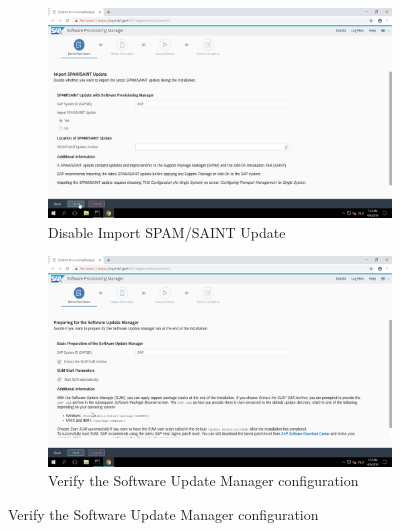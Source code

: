 \begin{figure}[!htb]\ContinuedFloat
    \begin{subfigure}{0.5\textwidth}
        \captionsetup{width=0.8\linewidth}
        \includegraphics[width=0.9\linewidth]{img/Methodologie/SAP07.png} 
        \centering
        \caption{Disable Import SPAM/SAINT Update}
    \end{subfigure}
    \begin{subfigure}{0.5\textwidth}
    \captionsetup{width=0.8\linewidth}
    \includegraphics[width=0.9\linewidth]{img/Methodologie/SAP05.png} 
    \centering
    \caption{Verify the Software Update Manager configuration}
\end{subfigure}
\end{figure}
